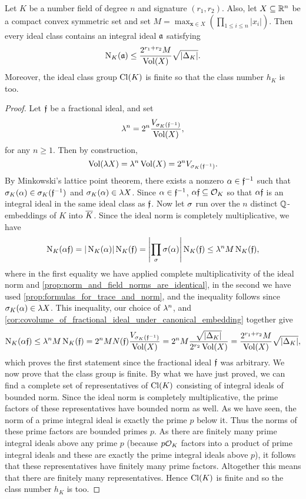     \begin{theorem}\label{equ:finitness_of_class_number}
      Let $K$ be a number field of degree $n$ and signature $(r_{1},r_{2})$. Also, let $X \subseteq \mathbb{R}^{n}$ be a compact convex symmetric set and set $M = \max_{\mathbf{x} \in X}\left(\prod_{1 \le i \le n}|x_{i}|\right)$. Then every ideal class contains an integral ideal $\mathfrak{a}$ satisfying
      \[
        \operatorname{\mathrm{N}}_{K}(\mathfrak{a}) \le \frac{2^{r_{1}+r_{2}}M}{\operatorname{\mathrm{Vol}}(X)}\sqrt{|\Delta_{K}|}.
      \]
      Moreover, the ideal class group $\operatorname{\mathrm{Cl}}(K)$ is finite so that the class number $h_{K}$ is too.
    \end{theorem}
    \begin{proof}
      Let $\mathfrak{f}$ be a fractional ideal, and set
      \[
        \lambda^{n} = 2^{n}\frac{V_{\sigma_{K}(\mathfrak{f}^{-1})}}{\operatorname{\mathrm{Vol}}(X)},
      \]
      for any $n \ge 1$. Then by construction,
      \[
        \operatorname{\mathrm{Vol}}(\lambda X) = \lambda^{n}\operatorname{\mathrm{Vol}}(X) = 2^{n}V_{\sigma_{K}(\mathfrak{f}^{-1})}.
      \]
      By Minkowski's lattice point theorem, there exists a nonzero $\alpha \in \mathfrak{f}^{-1}$ such that $\sigma_{K}(\alpha) \in \sigma_{K}(\mathfrak{f}^{-1})$ and $\sigma_{K}(\alpha) \in \lambda X$. Since $\alpha \in \mathfrak{f}^{-1}$, $\alpha\mathfrak{f} \subseteq \mathcal{O}_{K}$ so that $\alpha\mathfrak{f}$ is an integral ideal in the same ideal class as $\mathfrak{f}$. Now let $\sigma$ run over the $n$ distinct $\mathbb{Q}$-embeddings of $K$ into $\overline{K}$. Since the ideal norm is completely multiplicative, we have
      \[
        \operatorname{\mathrm{N}}_{K}(\alpha\mathfrak{f}) = |\operatorname{\mathrm{N}}_{K}(\alpha)|\operatorname{\mathrm{N}}_{K}(\mathfrak{f}) = \left|\prod_{\sigma}\sigma(\alpha)\right|\operatorname{\mathrm{N}}_{K}(\mathfrak{f}) \le \lambda^{n}M\operatorname{\mathrm{N}}_{K}(\mathfrak{f}),
      \]
      where in the first equality we have applied complete multiplicativity of the ideal norm and \cref{prop:norm_and_field_norms_are_identical}, in the second we have used \cref{prop:formulas_for_trace_and_norm}, and the inequality follows since $\sigma_{K}(\alpha) \in \lambda X$. This inequality, our choice of $\lambda^{n}$, and \cref{cor:covolume_of_fractional_ideal_under_canonical_embedding} together give
      \[
        \operatorname{\mathrm{N}}_{K}(\alpha\mathfrak{f}) \le \lambda^{n}M\operatorname{\mathrm{N}}_{K}(\mathfrak{f}) = 2^{n}MN(\mathfrak{f})\frac{V_{\sigma_{K}(\mathfrak{f}^{-1})}}{\operatorname{\mathrm{Vol}}(X)} = 2^{n}M\frac{\sqrt{|\Delta_{K}|}}{2^{r_{2}}\operatorname{\mathrm{Vol}}(X)} = \frac{2^{r_{1}+r_{2}}M}{\operatorname{\mathrm{Vol}}(X)}\sqrt{|\Delta_{K}|},
      \]
      which proves the first statement since the fractional ideal $\mathfrak{f}$ was arbitrary. We now prove that the class group is finite. By what we have just proved, we can find a complete set of representatives of $\operatorname{\mathrm{Cl}}(K)$ consisting of integral ideals of bounded norm. Since the ideal norm is completely multiplicative, the prime factors of these representatives have bounded norm as well. As we have seen, the norm of a prime integral ideal is exactly the prime $p$ below it. Thus the norms of these prime factors are bounded primes $p$. As there are finitely many prime integral ideals above any prime $p$ (because $p\mathcal{O}_{K}$ factors into a product of prime integral ideals and these are exactly the prime integral ideals above $p$), it follows that these representatives have finitely many prime factors. Altogether this means that there are finitely many representatives. Hence $\operatorname{\mathrm{Cl}}(K)$ is finite and so the class number $h_{K}$ is too.
    \end{proof}

